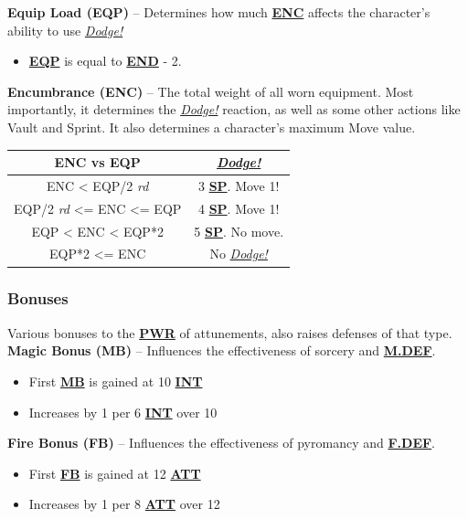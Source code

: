\documentclass[12pt]{article}
\newcommand{\refto}[1]{\hyperlink{#1}{\textbf{#1}}}
\newcommand{\makeref}[1]{\hypertarget{#1}{\textbf{#1}}}
\newcommand{\reftoit}[1]{\hyperlink{#1}{\emph{#1}}}
\begin{document}
\begin{multicols*}{2}
\textbf{Equip Load (\makeref{EQP})} – Determines how much \refto{ENC} affects the character’s ability to use \reftoit{Dodge!}
\begin{itemize}
\item \refto{EQP} is equal to \refto{END} - 2.
\end{itemize}

\setlength{\tabcolsep}{6pt}
\renewcommand{\arraystretch}{1.5}

\columnbreak

\textbf{Encumbrance (\makeref{ENC})} – The total weight of all worn equipment. Most importantly, it determines the \reftoit{Dodge!} reaction, as well as some other actions like Vault and Sprint. It also determines a character’s maximum Move value.

\begin{center}
\begin{tabular}{ |c|c| }
\hline
\textbf{ENC vs EQP} & \textbf{\reftoit{Dodge!}}\\
\hline
ENC < EQP/2 \emph{rd} & 3 \refto{SP}.  Move 1!\\
\hline
EQP/2 \emph{rd} <= ENC <= EQP & 4 \refto{SP}. Move 1!\\
\hline
EQP < ENC < EQP*2 & 5 \refto{SP}. No move.\\
\hline
EQP*2 <= ENC & No \reftoit{Dodge!}\\ 
\hline
\end{tabular}
\end{center}

\subsubsection{Bonuses}
Various bonuses to the \refto{PWR} of attunements, also raises defenses of that type.\\

\textbf{Magic Bonus (\makeref{MB})} – Influences the effectiveness of sorcery and \refto{M.DEF}.
\begin{itemize}
\item First \refto{MB} is gained at 10 \refto{INT}
\item Increases by 1 per 6 \refto{INT} over 10
\end{itemize}

\textbf{Fire Bonus (\makeref{FB})} – Influences the effectiveness of pyromancy and \refto{F.DEF}.
\begin{itemize}
\item First \refto{FB} is gained at 12 \refto{ATT}
\item Increases by 1 per 8 \refto{ATT} over 12
\end{itemize}


\end{multicols*}
\end{document}
